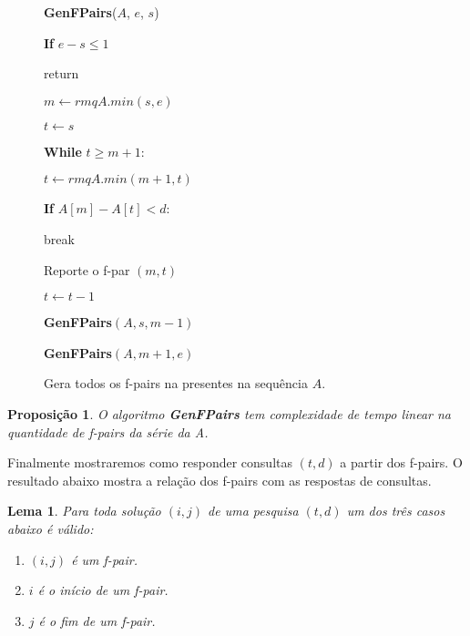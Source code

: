 \documentclass[12pt]{article}
\newtheorem{lem}[thm]{Lema}
\newtheorem{prop}[thm]{Proposição}
\begin{document}
\clearpage
\begin{figure}
\begin{framed}
{\bf GenFPairs}($A$, $e$, $s$)

\hspace{1cm} {\bf If} $e - s \le 1$

\hspace{2cm} return

\hspace{1cm} $m \leftarrow rmqA.min(s, e)$

\hspace{1cm} $t \leftarrow s$

\hspace{1cm} {\bf While} $t \ge m + 1$:

\hspace{2cm} $t \leftarrow rmqA.min(m + 1, t)$

\hspace{2cm} {\bf If} $A[m] - A[t] < d$:

\hspace{3cm} break

\hspace{2cm} Reporte o f-par $(m, t)$

\hspace{2cm} $t \leftarrow t - 1$

\hspace{1cm} {\bf GenFPairs}$(A, s, m - 1)$

\hspace{1cm} {\bf GenFPairs}$(A, m + 1, e)$

\end{framed}
\caption{Gera todos os f-pairs na presentes na sequência $A$.}
\label{gemfpair}
\end{figure}

\begin{prop}
O algoritmo {\bf GenFPairs} tem complexidade de tempo linear na quantidade
de f-pairs da série da A.
\end{prop}

Finalmente mostraremos como responder consultas $(t, d)$ a partir dos f-pairs.
O resultado abaixo mostra a relação dos f-pairs com as respostas de consultas.

\begin{lem}
\label{fundamental}
Para toda solução $(i, j)$ de uma pesquisa $(t, d)$ um dos três 
casos abaixo é válido:
\begin{enumerate}
\item $(i, j)$ é um f-pair.
\item $i$ é o início de um f-pair.
\item $j$ é o fim de um f-pair.
\end{enumerate}
\end{lem}
\end{document}
